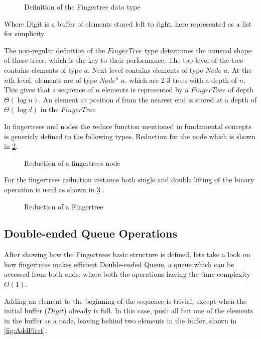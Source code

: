\begin{figure}[h!]

\caption{Definition of the Fingertree data type \label{fig:DataTypeFingertree}}
\end{figure}

Where Digit is a buffer of elements stored left to right, here represented as a
list for simplicity

The non-regular definition of the $FingerTree$ type determines the unusual shape
of these trees, which is the key to their performance. The top level of the tree
contains elements of type $a$. Next level contains elements of type $Node$ $a$.
At the $n$th level, elements are of type $Node^n$ $a$. which are 2-3 trees with
a depth of $n$. This gives that a sequence of $n$ elements is represented by
a $FingerTree$ of depth $\Theta(\log n)$. An element at position $d$ from
the nearest end is stored at a depth of $\Theta(\log d)$ in the $FingerTree$

In fingertrees and nodes the reduce function mentioned in fundamental concepts
is genericly defined to the following types. 
Reduction for the node which is shown in \cref{fig:reductionNode}.

\begin{figure}[h!]

\caption{Reduction of a fingertrees node \label{fig:reductionNode}}
\end{figure}

For the fingertrees reduction instance both single and double lifting of the binary
operation is used as shown in \cref{fig:reductionFingerTree} \cite{fingertree}.

\begin{figure}[h!]

\caption{Reduction of a Fingertree \label{fig:reductionFingerTree}}
\end{figure}

\subsection{Double-ended Queue Operations}
After showing how the Fingertrees basic structure is defined, lets take a look
on how fingertrees makes efficient Double-ended Queue, a queue which can be
accessed from both ends, where both the operations having the time complexity
$\Theta(1)$.

Adding an element to the beginning of the sequence is trivial, except
when the initial buffer ($Digit$) already is full. In this case, push all but
one of the elements in the buffer as a node, leaving behind two elements in the
buffer, shown in \cref{fig:AddFirst}.

